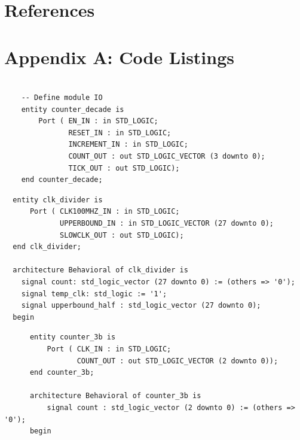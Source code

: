 \documentclass[11pt]{article}
\newenvironment{code}{\captionsetup{type=listing}}{}
\begin{document}
\section{References}
\printbibliography

\newpage

\section{Appendix A: Code Listings}

\begin{code}
	\begin{verbatim}
  
    -- Define module IO
    entity counter_decade is
        Port ( EN_IN : in STD_LOGIC;
               RESET_IN : in STD_LOGIC;
               INCREMENT_IN : in STD_LOGIC;
               COUNT_OUT : out STD_LOGIC_VECTOR (3 downto 0);
               TICK_OUT : out STD_LOGIC);
    end counter_decade;

  \end{verbatim}
	\captionsetup{belowskip=0pt}
	\label{code:entity_naming_convention}
\end{code}

\vspace*{1cm}

\begin{code}
	\begin{verbatim}
  entity clk_divider is
      Port ( CLK100MHZ_IN : in STD_LOGIC;
             UPPERBOUND_IN : in STD_LOGIC_VECTOR (27 downto 0);
             SLOWCLK_OUT : out STD_LOGIC);
  end clk_divider;

  architecture Behavioral of clk_divider is
    signal count: std_logic_vector (27 downto 0) := (others => '0');
    signal temp_clk: std_logic := '1';
    signal upperbound_half : std_logic_vector (27 downto 0);
  begin

  \end{verbatim}
	\captionsetup{belowskip=0pt}
	\label{code:case_io}
\end{code}

\vspace*{1cm}

\begin{code}
	\begin{verbatim}
      entity counter_3b is
          Port ( CLK_IN : in STD_LOGIC;
                 COUNT_OUT : out STD_LOGIC_VECTOR (2 downto 0));
      end counter_3b;

      architecture Behavioral of counter_3b is
          signal count : std_logic_vector (2 downto 0) := (others => '0');
      begin

  \end{verbatim}
	\captionsetup{belowskip=0pt}
	\label{code:case}

\end{code}
\end{document}
